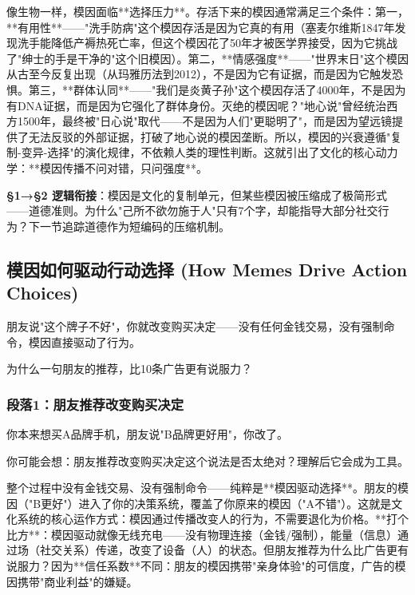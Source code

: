 \documentclass[openany, a4paper, 12pt]{book}
\newenvironment{motivation}{
	\vspace{0.5em}
	\begin{tcolorbox}[
		colback=gray!10,           %
		colframe=gray!60,          %
		title=\textit{本章动机 (Motivation)},
		fonttitle=\bfseries,
		arc=0mm,                   %
		leftrule=3mm               %
		]
		\small \itshape %
	}{
	\end{tcolorbox}
	\vspace{1em}
}
\begin{document}
\begin{motivation}
\begin{motivation}
\begin{motivation}
像生物一样，模因面临**选择压力**。存活下来的模因通常满足三个条件：第一，**有用性**——"洗手防病"这个模因存活是因为它真的有用（塞麦尔维斯1847年发现洗手能降低产褥热死亡率，但这个模因花了50年才被医学界接受，因为它挑战了"绅士的手是干净的"这个旧模因）。第二，**情感强度**——"世界末日"这个模因从古至今反复出现（从玛雅历法到2012），不是因为它有证据，而是因为它触发恐惧。第三，**群体认同**——"我们是炎黄子孙"这个模因存活了4000年，不是因为有DNA证据，而是因为它强化了群体身份。灭绝的模因呢？"地心说"曾经统治西方1500年，最终被"日心说"取代——不是因为人们"更聪明了"，而是因为望远镜提供了无法反驳的外部证据，打破了地心说的模因垄断。所以，模因的兴衰遵循"复制-变异-选择"的演化规律，不依赖人类的理性判断。这就引出了文化的核心动力学：**模因传播不问对错，只问强度**。

	\textbf{§1→§2 逻辑衔接}：模因是文化的复制单元，但某些模因被压缩成了极简形式——道德准则。为什么"己所不欲勿施于人"只有7个字，却能指导大部分社交行为？下一节追踪道德作为短编码的压缩机制。

	
	\subsection{模因如何驱动行动选择 (How Memes Drive Action Choices)}
	\begin{motivation}
		朋友说"这个牌子不好"，你就改变购买决定——没有任何金钱交易，没有强制命令，模因直接驱动了行为。
	\end{motivation}
	\begin{questionbox}
		为什么一句朋友的推荐，比10条广告更有说服力？
	\end{questionbox}

	\subsubsection*{段落1：朋友推荐改变购买决定}
	你本来想买A品牌手机，朋友说"B品牌更好用"，你改了。
	\begin{tcolorbox}[colback=yellow!5, title=\textit{读者行为预测}]
		你可能会想：朋友推荐改变购买决定这个说法是否太绝对？理解后它会成为工具。
	\end{tcolorbox}

整个过程中没有金钱交易、没有强制命令——纯粹是**模因驱动选择**。朋友的模因（"B更好"）进入了你的决策系统，覆盖了你原来的模因（"A不错"）。这就是文化系统的核心运作方式：模因通过传播改变人的行为，不需要退化为价格。**打个比方**：模因驱动就像无线充电——没有物理连接（金钱/强制），能量（信息）通过场（社交关系）传递，改变了设备（人）的状态。但朋友推荐为什么比广告更有说服力？因为**信任系数**不同：朋友的模因携带"亲身体验"的可信度，广告的模因携带"商业利益"的嫌疑。


\end{motivation}
\end{motivation}
\end{motivation}
\end{document}
